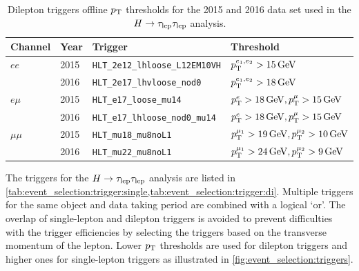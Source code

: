 \begin{table}[htpb]
    \centering
    \caption{Dilepton triggers offline $p_\text{T}$ thresholds for the 2015 and 2016 data set used in the $H \to \tau_\text{lep} \tau_\text{lep}$ analysis.}\label{tab:event_selection:trigger:di}
    \begin{tabular}{@{}llll@{}}
        \toprule
        Channel  & Year & Trigger & Threshold \\ \midrule
        $ee$     & 2015 & \texttt{HLT\_2e12\_lhloose\_L12EM10VH} & $\pt^{e_1, e_2} > \unit[15]{GeV}$ \\
                 & 2016 & \texttt{HLT\_2e17\_lhvloose\_nod0} & $\pt^{e_1, e_2} > \unit[18]{GeV}$ \\ \cmidrule{1-4}
        $e\mu$   & 2015 & \texttt{HLT\_e17\_loose\_mu14} & $\pt^{e} > \unit[18]{GeV}, \pt^\mu > \unit[15]{GeV}$ \\
                 & 2016 & \texttt{HLT\_e17\_lhloose\_nod0\_mu14} & $\pt^{e} > \unit[18]{GeV}, \pt^\mu > \unit[15]{GeV}$ \\ \cmidrule{1-4}
        $\mu\mu$ & 2015 & \texttt{HLT\_mu18\_mu8noL1} & $\pt^{\mu_1} > \unit[19]{GeV}, \pt^{\mu_2} > \unit[10]{GeV}$ \\
                 & 2016 & \texttt{HLT\_mu22\_mu8noL1} & $\pt^{\mu_1} > \unit[24]{GeV}, \pt^{\mu_2} > \unit[9]{GeV}$ \\
        \bottomrule
    \end{tabular}
\end{table}

The triggers for the $H \to \tau_\text{lep} \tau_\text{lep}$ analysis are listed in \cref{tab:event_selection:trigger:single,tab:event_selection:trigger:di}.
Multiple triggers for the same object and data taking period are combined with a logical `or'.
The overlap of single-lepton and dilepton triggers is avoided to prevent difficulties with the trigger efficiencies
by selecting the triggers based on the transverse momentum of the lepton.
Lower $p_\text{T}$ thresholds are used for dilepton triggers and higher ones for single-lepton triggers as
illustrated in \cref{fig:event_selection:triggers}.

